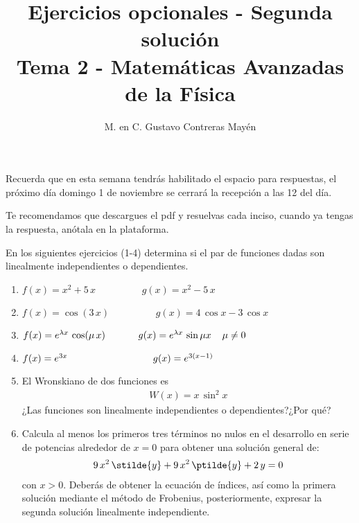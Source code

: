 
\usepackage{apacite}
\title{Ejercicios opcionales - Segunda solución\\[0.3em]  \large{Tema 2 - Matemáticas Avanzadas de la Física}\vspace{-3ex}}
\author{M. en C. Gustavo Contreras Mayén}
\date{ }

\vspace{-4cm}
\maketitle
\fontsize{14}{14}\selectfont
Recuerda que en esta semana tendrás habilitado el espacio para respuestas, el próximo día domingo 1 de noviembre se cerrará la recepción a las 12 del día.
\par
Te recomendamos que descargues el pdf y resuelvas cada inciso, cuando ya tengas la respuesta, anótala en la plataforma.
\par
En los siguientes ejercicios (1-4) determina si el par de funciones dadas son linealmente independientes o dependientes.
\begin{enumerate}
\item $f(x) = x^{2} + 5 \, x \hspace{2cm} g(x) = x^{2} - 5 \, x$ 
\item $f(x) = \cos (3 \, x) \hspace{2cm} g(x) = 4 \, \cos x - 3 \, \cos x$
\item $f(x) = e^{\lambda x} \, \cos (\mu \, x) \hspace{1.2cm} g(x) = e^{\lambda x} \, \sin \mu x \hspace{0.4cm} \mu \neq 0 $
\item $f(x) = e^{3 x} \hspace{3.1cm} g(x) = e^{3(x-1)}$
\item El Wronskiano de dos funciones es
\begin{align*}
W(x) = x \, \sin^{2} x
\end{align*}
¿Las funciones son linealmente independientes o dependientes?¿Por qué?
\item Calcula al menos los primeros tres términos no nulos en el desarrollo en serie de potencias alrededor de $x=0$ para obtener una solución general de:
\begin{align*}
9 \, x^{2} \, \stilde{y} + 9 \, x^{2} \, \ptilde{y} + 2 \, y = 0
\end{align*}
con $x > 0$. Deberás de obtener la ecuación de índices, así como la primera solución mediante el método de Frobenius, posteriormente, expresar la segunda solución linealmente independiente.
\end{enumerate}
